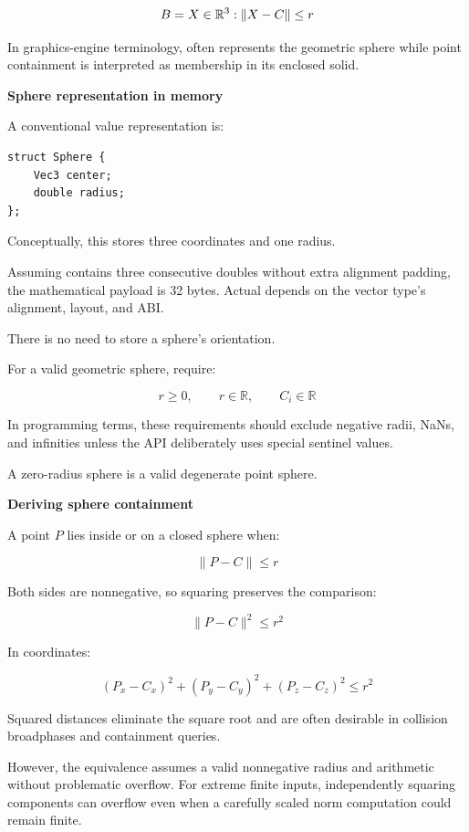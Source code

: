 \[
B=\\{X\in\mathbb R^3:\|X-C\|\le r\\}
\]

In graphics-engine terminology,  often represents the geometric sphere while point containment is interpreted as membership in its enclosed solid.

\textbf{Sphere representation in memory}

A conventional value representation is:

\begin{verbatim}
struct Sphere {
    Vec3 center;
    double radius;
};
\end{verbatim}

Conceptually, this stores three coordinates and one radius.

Assuming  contains three consecutive doubles without extra alignment padding, the mathematical payload is 32 bytes. Actual  depends on the vector type's alignment, layout, and ABI.

There is no need to store a sphere's orientation.

For a valid geometric sphere, require:

\[
r\ge0,\qquad r\in\mathbb R,\qquad C_i\in\mathbb R
\]

In programming terms, these requirements should exclude negative radii, NaNs, and infinities unless the API deliberately uses special sentinel values.

A zero-radius sphere is a valid degenerate point sphere.

\textbf{Deriving sphere containment}

A point \(P\) lies inside or on a closed sphere when:

\[
\|P-C\|\le r
\]

Both sides are nonnegative, so squaring preserves the comparison:

\[
\boxed{\|P-C\|^2\le r^2}
\]

In coordinates:

\[
(P_x-C_x)^2+ (P_y-C_y)^2+ (P_z-C_z)^2\le r^2
\]

Squared distances eliminate the square root and are often desirable in collision broadphases and containment queries.

However, the equivalence assumes a valid nonnegative radius and arithmetic without problematic overflow. For extreme finite inputs, independently squaring components can overflow even when a carefully scaled norm computation could remain finite.

